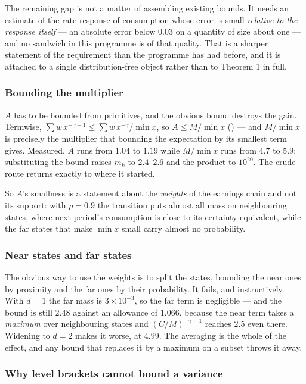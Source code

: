 The remaining gap is not a matter of assembling existing bounds. It needs an estimate of the
rate-response of consumption whose error is small \emph{relative to the response itself} --- an
absolute error below $0.03$ on a quantity of size about one --- and no sandwich in this programme is
of that quality. That is a sharper statement of the requirement than the programme has had before,
and it is attached to a single distribution-free object rather than to Theorem 1 in full.

\subsubsection*{Bounding the multiplier}

$A$ has to be bounded from primitives, and the obvious bound destroys the gain. Termwise,
$\sum w\,x^{-\gamma-1}\le\sum w\,x^{-\gamma}/\min x$, so $A\le M/\min x$
() --- and $M/\min x$ is precisely the multiplier that bounding the
expectation by its smallest term gives. Measured, $A$ runs from $1.04$ to $1.19$ while $M/\min x$ runs
from $4.7$ to $5.9$; substituting the bound raises $m_k$ to $2.4$--$2.6$ and the product to $10^{20}$.
The crude route returns exactly to where it started.

So $A$'s smallness is a statement about the \emph{weights} of the earnings chain and not its support:
with $\rho=0.9$ the transition puts almost all mass on neighbouring states, where next period's
consumption is close to its certainty equivalent, while the far states that make $\min x$ small carry
almost no probability.

\subsubsection*{Near states and far states}

The obvious way to use the weights is to split the states, bounding the near ones by proximity and
the far ones by their probability. It fails, and instructively. With $d=1$ the far mass is
$3\times10^{-3}$, so the far term is negligible --- and the bound is still $2.48$ against an
allowance of $1.066$, because the near term takes a \emph{maximum} over neighbouring states and
$(C/M)^{-\gamma-1}$ reaches $2.5$ even there. Widening to $d=2$ makes it worse, at $4.99$. The
averaging is the whole of the effect, and any bound that replaces it by a maximum on a subset throws
it away.

\subsubsection*{Why level brackets cannot bound a variance}

